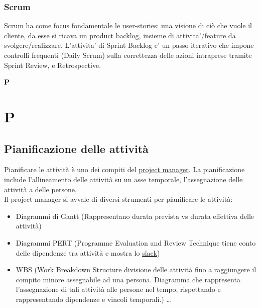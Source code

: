 			\subsubsection{Scrum}
				Scrum ha come focus fondamentale le  user-stories: una visione di ciò che vuole il cliente, da esse si ricava un product backlog, insieme di attivita'/feature da svolgere/realizzare. L'attivita' di Sprint Backlog e' un passo iterativo che impone controlli frequenti (Daily Scrum) sulla correttezza delle azioni intraprese tramite Sprint Review, e Retrospective.\newpage

	{\Huge{\textbf{P}}} \\
	\section{P}
	

	\subsection{Pianificazione delle attività}	
	\label{sec:pianificazioneattivita}
	Pianificare le attività è uno dei compiti del \hyperref[sec:projectmanager]{project manager}.
	La pianificazione include l'allineamento delle attività su un asse temporale, l'assegnazione delle attività a delle persone. \\Il project manager si avvale di diversi strumenti per pianificare le attività:  	
	\begin{itemize}  
	\item Diagrammi di Gantt (Rappresentano durata prevista vs durata effettiva delle attività)
	\item Diagrammi PERT (Programme Evaluation and Review Technique tiene conto delle dipendenze tra attività e mostra lo \hyperref[sec:slack]{slack})
	\item WBS (Work Breakdown Structure divisione delle attività fino a raggiungere il compito minore assegnabile ad una persona. Diagramma che rappresenta l'assegnazione di tali attività alle persone nel tempo, rispettando e rappresentando dipendenze e vincoli temporali.) \ldots 
	\end{itemize}	
	

